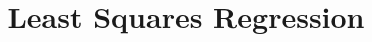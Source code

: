 \documentclass{beamer}
\title[MA205 - Section 8.2]{Least Squares Regression}
\begin{document}
\begin{frame}
  \titlepage
\end{frame}
\end{document}
